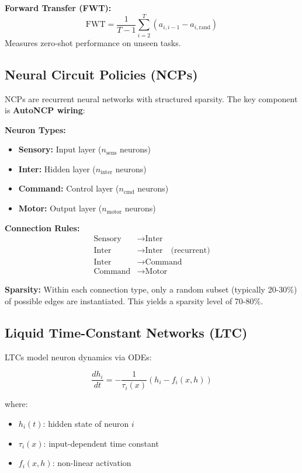 \documentclass[11pt,twocolumn]{article}
\begin{document}
\textbf{Forward Transfer (FWT):}
\begin{equation}
    \text{FWT} = \frac{1}{T-1} \sum_{i=2}^{T} (a_{i,i-1} - a_{i,\text{rand}})
\end{equation}
Measures zero-shot performance on unseen tasks.

\subsection{Neural Circuit Policies (NCPs)}

NCPs are recurrent neural networks with structured sparsity. The key component is \textbf{AutoNCP wiring}:

\textbf{Neuron Types:}
\begin{itemize}
    \item \textbf{Sensory:} Input layer ($n_{\text{sens}}$ neurons)
    \item \textbf{Inter:} Hidden layer ($n_{\text{inter}}$ neurons)
    \item \textbf{Command:} Control layer ($n_{\text{cmd}}$ neurons)
    \item \textbf{Motor:} Output layer ($n_{\text{motor}}$ neurons)
\end{itemize}

\textbf{Connection Rules:}
\begin{align}
    \text{Sensory} &\rightarrow \text{Inter} \\
    \text{Inter} &\rightarrow \text{Inter} \quad \text{(recurrent)} \\
    \text{Inter} &\rightarrow \text{Command} \\
    \text{Command} &\rightarrow \text{Motor}
\end{align}

\textbf{Sparsity:} Within each connection type, only a random subset (typically 20-30\%) of possible edges are instantiated. This yields a sparsity level of 70-80\%.

\subsection{Liquid Time-Constant Networks (LTC)}

LTCs model neuron dynamics via ODEs:

\begin{equation}
    \frac{dh_i}{dt} = -\frac{1}{\tau_i(x)} (h_i - f_i(x, h))
\end{equation}

where:
\begin{itemize}
    \item $h_i(t)$: hidden state of neuron $i$
    \item $\tau_i(x)$: input-dependent time constant
    \item $f_i(x, h)$: non-linear activation
\end{itemize}
\end{document}
